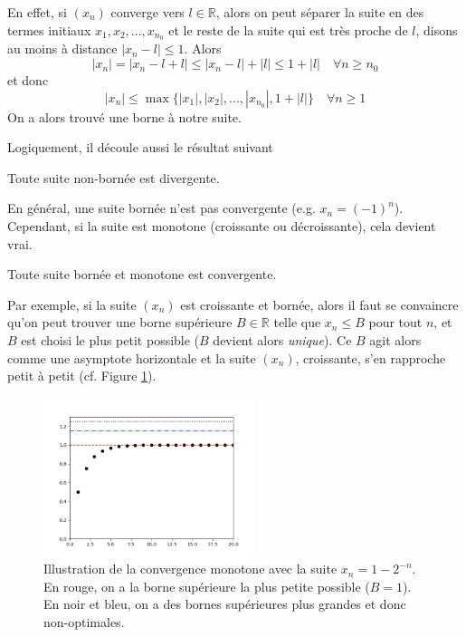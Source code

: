 En effet, si $(x_n)$ converge vers $l \in \mathbb R$, alors on peut séparer la suite en des termes initiaux $x_1,x_2,...,x_{n_0}$ et le reste de la suite qui est très proche de $l$, disons au moins à distance $|x_n - l| \leq 1$. Alors
$$|x_n| = |x_n - l + l| \leq |x_n - l| + |l| \leq 1 + |l| \quad \forall n \geq n_0$$ et donc
$$|x_n| \leq \max\{|x_1|, |x_2|, ..., |x_{n_0}|, 1 + |l|\} \quad \forall n \geq 1$$
On a alors trouvé une borne à notre suite.

Logiquement, il découle aussi le résultat suivant

\begin{boxthm}
Toute suite non-bornée est divergente.
\end{boxthm}

En général, une suite bornée n'est pas convergente (e.g. $x_n = (-1)^n$). Cependant, si la suite est monotone (croissante ou décroissante), cela devient vrai.
\begin{boxthm}
Toute suite bornée et monotone est convergente.
\label{thm:conv_monotone}
\end{boxthm}
Par exemple, si la suite $(x_n)$ est croissante et bornée, alors il faut se convaincre qu'on peut trouver une borne supérieure $B \in \mathbb{R}$ telle que $x_n \leq B$ pour tout $n$, et $B$ est choisi le plus petit possible ($B$ devient alors \emph{unique}). Ce $B$ agit alors comme une asymptote horizontale et la suite $(x_n)$, croissante, s'en rapproche petit à petit (cf. Figure \ref{fig:conv_monotone}).

\begin{figure}[H]
\centering \includegraphics[width = 0.55\textwidth]{./assets/imgs/monotone_convergence.png}
\caption{Illustration de la convergence monotone avec la suite $x_n = 1 - 2^{-n}$. En rouge, on a la borne supérieure la plus petite possible ($B = 1$). En noir et bleu, on a des bornes supérieures plus grandes et donc non-optimales.}
\label{fig:conv_monotone}
\end{figure}

